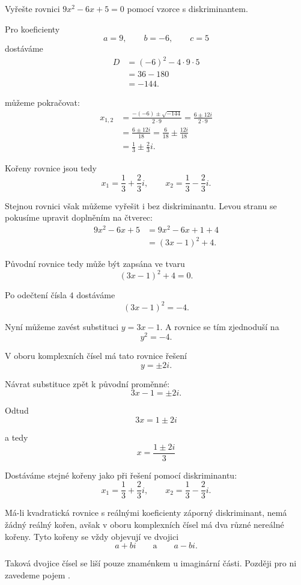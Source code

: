 \documentclass[12pt,a4paper]{article}
\begin{document}
\begin{examplebox}
    Vyřešte rovnici $9x^2-6x+5=0$ pomocí vzorce s diskriminantem.

    Pro koeficienty
    \[
        a=9,\qquad b=-6,\qquad c=5
    \]
    dostáváme
    \begin{align*}
        D   &=(-6)^2-4 \cdot 9 \cdot 5 \\
            &=36-180 \\
            &=-144.
    \end{align*}

    můžeme pokračovat:
    \begin{align*}
        x_{1,2} &= \frac{-(-6) \pm \sqrt{-144}}{2 \cdot 9}
                 = \frac{6 \pm 12i}{2 \cdot 9} \\
                &= \frac{6 \pm 12i}{18}
                 = \frac{6}{18} \pm \frac{12i}{18} \\   
                &= \frac{1}{3} \pm \frac{2}{3}i.
    \end{align*}

    Kořeny rovnice jsou tedy
    \[
        x_1=\frac{1}{3}+\frac{2}{3}i,
        \qquad
        x_2=\frac{1}{3}-\frac{2}{3}i.
    \]
\end{examplebox}

Stejnou rovnici však můžeme vyřešit i bez diskriminantu.
Levou stranu se pokusíme upravit doplněním na čtverec:
\begin{align*}
    9x^2-6x+5   &= 9x^2-6x+1+4 \\
                &= (3x-1)^2+4.
\end{align*}

Původní rovnice tedy může být zapsána ve tvaru
\[
    (3x-1)^2+4=0.
\]

Po odečtení čísla $4$ dostáváme
\[
    (3x-1)^2=-4.
\]

Nyní můžeme zavést substituci $y=3x-1$. A rovnice se tím zjednoduší na
\[
    y^2=-4.
\]

V oboru komplexních čísel má tato rovnice řešení
\[
    y=\pm2i.
\]

Návrat substituce zpět k původní proměnné:
\[
    3x-1=\pm2i.
\]

Odtud
\[
    3x=1\pm2i
\]

a tedy
\[
    x=\frac{1\pm2i}{3}
\]

Dostáváme stejné kořeny jako při řešení pomocí diskriminantu:
\[
    x_1=\frac{1}{3}+\frac{2}{3}i,
    \qquad
    x_2=\frac{1}{3}-\frac{2}{3}i.
\]

\begin{notebox}
    Má-li kvadratická rovnice s reálnými koeficienty záporný diskriminant, nemá
    žádný reálný kořen, avšak v oboru komplexních čísel má dva různé nereálné kořeny.
    Tyto kořeny se vždy objevují ve dvojici
    \[
        a+bi
        \qquad\text{a}\qquad
        a-bi.
    \]

    Taková dvojice čísel se liší pouze znaménkem u imaginární části. 
    Později pro ni zavedeme pojem .
\end{notebox}
\end{document}
